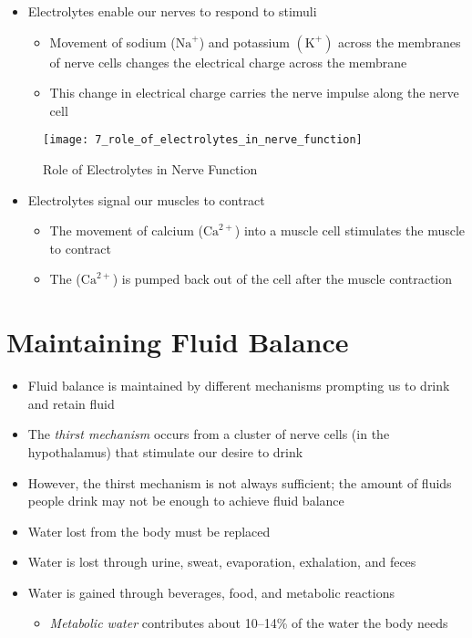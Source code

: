 \documentclass[title={Chapter 7}]{fdsn201notes}
\begin{document}
\begin{itemize}
	\item Electrolytes enable our nerves to respond to stimuli
	\begin{itemize}
		\item Movement of sodium ($\mbox{Na}^{+}$) and potassium $(\mbox{K}^{+})$ across the membranes of nerve cells changes the electrical charge across the membrane
		\item This change in electrical charge carries the nerve impulse along the nerve cell
	\end{itemize}
\end{itemize}

\begin{figure}[H]
	\centering
	\texttt{[image: 7\_role\_of\_electrolytes\_in\_nerve\_function]}
	\caption{Role of Electrolytes in Nerve Function}
	\label{fig:7_role_of_electrolytes_in_nerve_function}
\end{figure}

\begin{itemize}
	\item Electrolytes signal our muscles to contract
	\begin{itemize}
		\item The movement of calcium ($\mbox{Ca}^{2+}$) into a muscle cell stimulates the muscle to contract
		\item The ($\mbox{Ca}^{2+}$) is pumped back out of the cell after the muscle contraction
	\end{itemize}
\end{itemize}

\section{Maintaining Fluid Balance}\label{sec:maintaining-fluid-balance}
\begin{itemize}
	\item Fluid balance is maintained by different mechanisms prompting us to drink and retain fluid
	\item The \emph{thirst mechanism} occurs from a cluster of nerve cells (in the hypothalamus) that stimulate our desire to drink
	\item However, the thirst mechanism is not always sufficient; the amount of fluids people drink may not be enough to achieve fluid balance
	\item Water lost from the body must be replaced
	\item Water is lost through urine, sweat, evaporation, exhalation, and feces
	\item Water is gained through beverages, food, and metabolic reactions
	\begin{itemize}
		\item \emph{Metabolic water} contributes about 10--14\% of the water the body needs
	\end{itemize}
\end{itemize}
\end{document}
